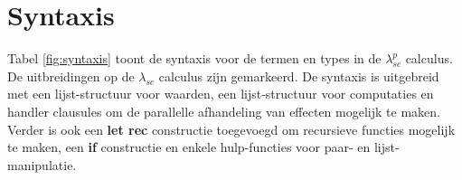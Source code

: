 \chapter{Syntaxis}
\label{hoofdstuk:syntaxis}

Tabel \ref{fig:syntaxis} toont de syntaxis voor de termen en types in de $\lambda_{sc}^{p}$ calculus. De uitbreidingen op de $\lambda_{sc}$ calculus zijn gemarkeerd. De syntaxis is uitgebreid met een lijst-structuur voor waarden, een lijst-structuur voor computaties en handler clausules om de parallelle afhandeling van effecten mogelijk te maken. Verder is ook een \textbf{let rec} constructie toegevoegd om recursieve functies mogelijk te maken, een \textbf{if} constructie en enkele hulp-functies voor paar- en lijst-manipulatie.


